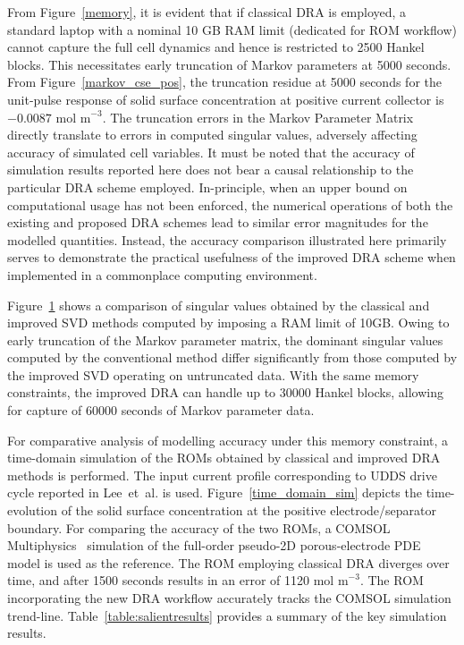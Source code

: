 From Figure~\ref{memory}, it is evident that if classical DRA
is employed, a standard laptop with a nominal 10 GB RAM limit (dedicated
for ROM workflow) cannot capture the full cell dynamics and hence
is restricted to 2500 Hankel blocks. This necessitates early truncation
of Markov parameters at 5000 seconds. From Figure~\ref{markov_cse_pos},
the truncation residue at 5000 seconds for the unit-pulse response
of solid surface concentration at positive current collector is $-0.0087 \text{ mol m}^{-\text{3}}$.
The truncation errors in the Markov Parameter Matrix directly translate
to errors in computed singular values, adversely affecting accuracy
of simulated cell variables. It must be noted that the accuracy of
simulation results reported here does not bear a causal relationship
to the particular DRA scheme employed. In-principle, when an upper
bound on computational usage has not been enforced, the numerical
operations of both the existing and proposed DRA schemes lead to similar
error magnitudes for the modelled quantities. Instead, the accuracy
comparison illustrated here primarily serves to demonstrate the practical
usefulness of the improved DRA scheme when implemented in a commonplace
computing environment.

\begin{figure}
	\caption{}
	\label{truncated}
\end{figure}

Figure~\ref{truncated} shows a comparison of singular values obtained
by the classical and improved SVD methods computed by imposing a RAM
limit of 10GB. Owing to early truncation of the Markov parameter matrix,
the dominant singular values computed by the conventional method differ
significantly from those computed by the improved SVD operating on
untruncated data. With the same memory constraints, the improved DRA
can handle up to 30000 Hankel blocks, allowing for capture of 60000
seconds of Markov parameter data.

For comparative analysis of modelling accuracy under this memory constraint,
a time-domain simulation of the ROMs obtained by classical and improved
DRA methods is performed. The input current profile corresponding
to UDDS drive cycle reported in Lee~et~al. \citep{LeeChemistruckPlett2012}
is used. Figure~\ref{time_domain_sim} depicts the time-evolution
of the solid surface concentration at the positive electrode/separator
boundary. For comparing the accuracy of the two ROMs, a COMSOL Multiphysics~\citep{Multiphysics2012}
simulation of the full-order pseudo-2D porous-electrode PDE model
is used as the reference. The ROM employing classical DRA diverges
over time, and after 1500 seconds results in an error of 1120$\text{ mol m}^{-\text{3}}$$.$
The ROM incorporating the new DRA workflow accurately tracks the COMSOL
simulation trend-line. Table~\ref{table:salientresults} provides
a summary of the key simulation results.

